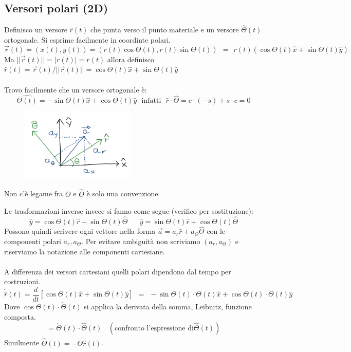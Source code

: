 \subsection{Versori polari (2D)}
Definisco un versore $\hat{r}(t)$ che punta verso il punto materiale e un versore $\hat{\Theta}(t)$ ortogonale.
Si esprime facilmente in coordinte polari.
$$\vec{r}(t) = (x(t), y(t)) = (r(t)\cos \Theta(t), r(t)\sin\Theta(t)) \:\: = \:\: r(t)(\cos\Theta(t)\hat{x} + \sin\Theta(t)\hat{y})$$
Ma $||\vec{r}(t)|| = |r(t)| = r(t)$ allora definisco $\hat{r}(t) = \vec{r}(t)/ ||\vec{r}(t)|| = \cos \Theta(t)\hat{x} + \sin\Theta(t)\hat{y}$\\\\
Trovo facilmente che un versore ortogonale è:
$$\hat{\Theta(t)} = -\sin\Theta(t)\hat{x} + \cos\Theta(t)\hat{y} \:\:\:\text{infatti} \:\:\: \hat{r}\cdot \hat{\Theta} = c \cdot (-s) + s \cdot c = 0$$
\begin{figure}
    \centering
    \includegraphics[width=5.5cm]{images/trasformazioni-inverse.png}
\end{figure}
\begin{note}
    Non c'è legame fra $\Theta$ e $\hat{\Theta}$ è solo una convenzione.
\end{note}
\hspace{-15pt}Le trasformazioni inverse invece si fanno come segue (verifico per sostituzione):
$$\hat{y} = \cos\Theta(t)\hat{r} - \sin\Theta(t)\hat{\Theta} \hspace{20pt} \hat{y} = \sin\Theta(t)\hat{r} + \cos\Theta(t)\hat{\Theta}$$
Possono quindi scrivere ogni vettore nella forma $\vec{a} = a_r\hat{r} + a_{\Theta}\hat{\Theta}$ con le componenti polari $a_r, a_{\Theta}$.
Per evitare ambiguità non scriviamo $(a_r, a_{\Theta})$ e riserviamo la notazione alle componenti cartesiane.\\\\
A differenza dei versori cartesiani quelli polari dipendono dal tempo per costruzioni.
$$\dot{\hat{r}}(t) = \frac{d}{dt}[\cos\Theta(t) \hat{x} + \sin\Theta(t)\hat{y}] \:\: = \:\: -\sin\Theta(t) \cdot \dot{\Theta}(t)\hat{x} + \cos\Theta(t) \cdot \dot{\Theta}(t)\hat{y}$$
Dove $\cos\Theta(t) \cdot \dot{\Theta}(t)$ si applica la derivata della somma, Leibnitz, funzione composta.
$$= \dot{\Theta}(t)\cdot \hat{\Theta}(t) \:\:\:\:(\text{confronto l'espressione di} \hat{\Theta}(t))$$
Similmente $\dot{\hat{\Theta}}(t)= - \dot{\Theta}\hat{r}(t)$.


